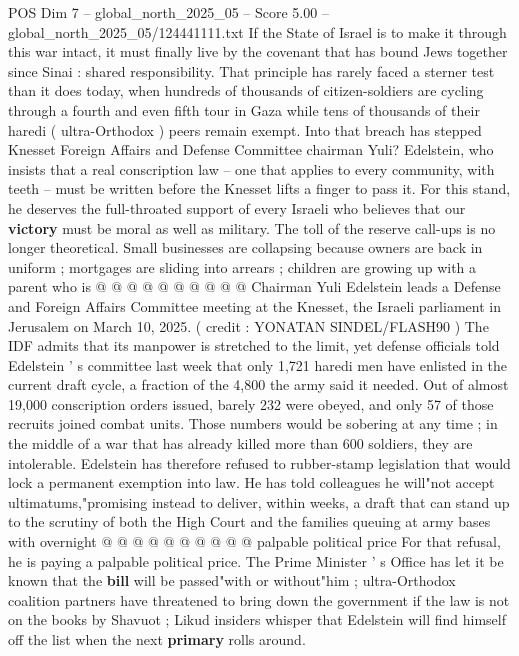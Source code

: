 \begin{textsample}{POS Dim 7 – global\_north\_2025\_05 – Score 5.00 – global\_north\_2025\_05/124441111.txt}  \label{ex:f7_pos_336}
If the State of Israel is to make it through this war intact, it must finally live by the covenant that has bound Jews together since Sinai : shared responsibility.
That principle has rarely faced a sterner test than it does today, when hundreds of thousands of citizen-soldiers are cycling through a fourth and even fifth tour in Gaza while tens of thousands of their haredi ( ultra-Orthodox ) peers remain exempt.
Into that breach has stepped Knesset Foreign Affairs and Defense Committee chairman Yuli?
Edelstein, who insists that a real conscription law -- one that applies to every community, with teeth -- must be written before the Knesset lifts a finger to pass it.
For this stand, he deserves the full-throated support of every Israeli who believes that our \textbf{victory} must be moral as well as military.
The toll of the reserve call-ups is no longer theoretical.
Small businesses are collapsing because owners are back in uniform ; mortgages are sliding into arrears ; children are growing up with a parent who is @ @ @ @ @ @ @ @ @ @ Chairman Yuli Edelstein leads a Defense and Foreign Affairs Committee meeting at the Knesset, the Israeli parliament in Jerusalem on March 10, 2025. ( credit : YONATAN SINDEL/FLASH90 ) The IDF admits that its manpower is stretched to the limit, yet defense officials told Edelstein ' s committee last week that only 1,721 haredi men have enlisted in the current draft cycle, a fraction of the 4,800 the army said it needed.
Out of almost 19,000 conscription orders issued, barely 232 were obeyed, and only 57 of those recruits joined combat units.
Those numbers would be sobering at any time ; in the middle of a war that has already killed more than 600 soldiers, they are intolerable.
Edelstein has therefore refused to rubber-stamp legislation that would lock a permanent exemption into law.
He has told colleagues he will"not accept ultimatums,"promising instead to deliver, within weeks, a draft that can stand up to the scrutiny of both the High Court and the families queuing at army bases with overnight @ @ @ @ @ @ @ @ @ @ palpable political price For that refusal, he is paying a palpable political price.
The Prime Minister ' s Office has let it be known that the \textbf{bill} will be passed"with or without"him ; ultra-Orthodox coalition partners have threatened to bring down the government if the law is not on the books by Shavuot ; Likud insiders whisper that Edelstein will find himself off the list when the next \textbf{primary} rolls around.

\end{textsample}
